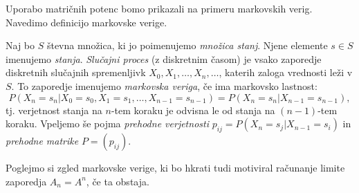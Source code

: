 \documentclass[mat1]{fmfdelo}
\begin{document}
Uporabo matričnih potenc bomo prikazali na primeru markovskih verig. Navedimo definicijo markovske verige.
\begin{definicija}
    Naj bo $S$ števna množica, ki jo poimenujemo \emph{množica stanj}. Njene elemente $s \in S$ imenujemo \emph{stanja}. \emph{Slučajni proces} (z diskretnim časom) je vsako zaporedje diskretnih slučajnih spremenljivk $X_0, X_1, \ldots, X_n, \ldots$, katerih zaloga vrednosti leži v $S$. To zaporedje imenujemo \emph{markovska veriga}, če ima markovsko lastnost:
    \begin{equation}
        P(X_n = s_n | X_0 = s_0, X_1 = s_1, \ldots, X_{n-1} = s_{n-1}) = P(X_n = s_n | X_{n-1} = s_{n-1}),
    \end{equation}
    tj. verjetnost stanja na $n$-tem koraku je odvisna le od stanja na $(n-1)$-tem koraku. Vpeljemo še pojma \emph{prehodne verjetnosti} $p_{ij} = P(X_n = s_j | X_{n-1} = s_i)$ in \emph{prehodne matrike} $P = (p_{ij})$.
\end{definicija}
Poglejmo si zgled markovske verige, ki bo hkrati tudi motiviral računanje limite zaporedja $A_n = A^n$, če ta obstaja. 
\end{document}

